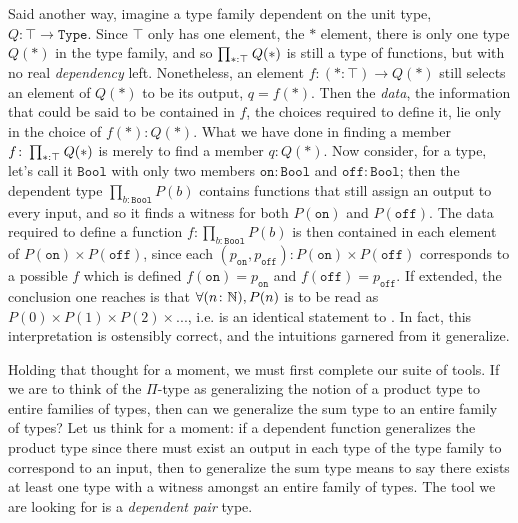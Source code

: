 \documentclass[11pt]{article}
\begin{document}
Said another way, imagine a type family dependent on the unit type, $Q \colon \top \to \mathtt{Type}$. Since $\top$ only has one element, the $*$ element, there is only one type $Q(*)$ in the type family, and so $\prod_{* : \top} \hspace{0.05em} Q(*)$ is still a type of functions, but with no real \emph{dependency} left. Nonetheless, an element $f \colon (* : \top) \to Q(*)$ still selects an element of $Q(*)$ to be its output, $q = f(*)$. Then the \emph{data}, the information that could be said to be contained in $f$, the choices required to define it, lie only in the choice of $f(*) \colon Q(*)$. What we have done in finding a member $f \colon \prod_{* : \top} \hspace{0.05em} Q(*)$ is merely to find a member $q \colon Q(*)$. Now consider, for a type, let's call it $\mathtt{Bool}$ with only two members $\mathtt{on}\colon \mathtt{Bool}$ and $\mathtt{off} \colon \mathtt{Bool}$; then the dependent type $\prod_{b : \mathtt{Bool}} P(b)$ contains functions that still assign an output to every input, and so it finds a witness for both $P(\mathtt{on})$ and $P(\mathtt{off})$. The data required to define a function $f \colon \prod_{b : \mathtt{Bool}} P(b)$ is then contained in each element of $P(\mathtt{on}) \times P(\mathtt{off})$, since each $(p_{\mathtt{on}},p_{\mathtt{off}}) \colon P(\mathtt{on}) \times P(\mathtt{off})$ corresponds to a possible $f$ which is defined $f(\mathtt{on}) = p_{\mathtt{on}}$ and $f(\mathtt{off}) =  p_{\mathtt{off}}$. If extended, the conclusion one reaches is that $\forall (n \colon \mathbb{N}), P(n)$ is to be read as $P(0) \times P(1) \times P(2) \times ...$, i.e.  is an identical statement to . In fact, this interpretation is ostensibly correct, and the intuitions garnered from it generalize.

Holding that thought for a moment, we must first complete our suite of tools. If we are to think of the $\Pi$-type as generalizing the notion of a product type to entire families of types, then can we generalize the sum type to an entire family of types? Let us think for a moment: if a dependent function generalizes the product type since there must exist an output in each type of the type family to correspond to an input, then to generalize the sum type means to say there exists at least one type with a witness amongst an entire family of types. The tool we are looking for is a \emph{dependent pair} type.
\end{document}
